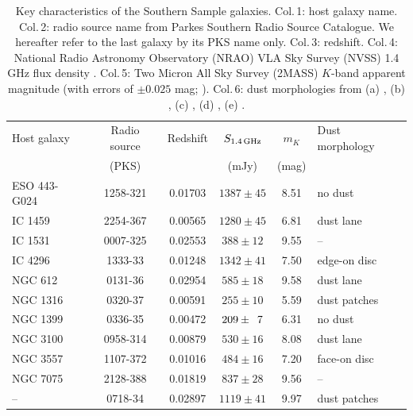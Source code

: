 \documentclass[a4paper,fleqn,usenatbib]{mnras}
\begin{document}
	\begin{table}
		\centering
		\caption{Key characteristics of the Southern Sample galaxies. Col.\,1: host galaxy name. Col.\,2: radio source name from Parkes Southern Radio Source Catalogue. We hereafter refer to the last galaxy by its PKS name only. Col.\,3: redshift. Col.\,4: National Radio Astronomy Observatory (NRAO) VLA Sky Survey (NVSS) 1.4 GHz flux density \citep{Condon1998}. Col.\,5: Two Micron All Sky Survey (2MASS) $K$-band apparent magnitude (with errors of $\pm 0.025$ mag; \citealt{Skrutskie2006}). Col.\,6: dust morphologies from (a) \citet{Govoni2000}, (b) \citet{Lauer2005}, (c) \citet{Bettoni2001}, (d) \citet{Sandage1979}, (e) \citet{Colbert2001}.}
		\label{tab:sample}
		\begin{tabular}{l c c c c l}
			\hline
			\hline
			Host galaxy	& Radio source 	& Redshift	& $S_\text{1.4\,GHz}$	& $m_K$ & Dust morphology\\
						& (PKS) 		& 			& (mJy) 			& (mag)	&\\
			\hline 
			ESO 443-G024 & 1258-321 	& 0.01703	& $1387 \pm 45$		& 8.51 & no dust\tnote{a}	\\ 
			IC 1459 	& 2254-367 		& 0.00565 	& $1280 \pm 45$		& 6.81 & dust lane\tnote{b}	\\
			IC 1531 	& 0007-325 		& 0.02553 	& \leavevmode\phantom{0}$388 \pm 12$		& 9.55 & --					\\
			IC 4296		& 1333-\leavevmode\phantom{0}33 		& 0.01248 	& $1342 \pm 41$		& 7.50 & edge-on disc\tnote{b} \\
			NGC 612 	& 0131-\leavevmode\phantom{0}36 		& 0.02954 	& \leavevmode\phantom{0}$585 \pm 18$		& 9.58 & dust lane\tnote{c}	\\
			NGC 1316 	& 0320-\leavevmode\phantom{0}37 & 0.00591 	& \leavevmode\phantom{0}$255 \pm 10$		& 5.59 & dust patches\tnote{b} \\
			NGC 1399 	& 0336-\leavevmode\phantom{0}35 & 0.00472 	& \leavevmode\phantom{0}$209 \pm \leavevmode\phantom{0}7$	& 6.31 & no dust\tnote{b}	\\
			NGC 3100 	& 0958-314 		& 0.00879 	& \leavevmode\phantom{0}$530 \pm 16$		& 8.08 & dust lane\tnote{d}	\\
			NGC 3557 	& 1107-372 		& 0.01016 	& \leavevmode\phantom{0}$484 \pm 16$		& 7.20 & face-on disc\tnote{b}\\
			NGC 7075 	& 2128-388 		& 0.01819 	& \leavevmode\phantom{0}$837 \pm 28$		& 9.56 & --					\\
			--			& 0718-\leavevmode\phantom{0}34 		& 0.02897 	& $1119 \pm 41$		& 9.97 & dust patches\tnote{e} \\

\end{tabular}
\end{table}
\end{document}
